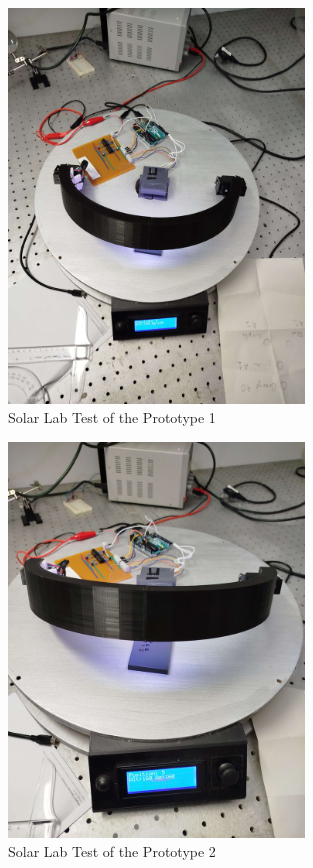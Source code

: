 \begin{figure}[htbp]
    \centering
    \includegraphics[width=0.7\textwidth]{figures/methodology/Prototype_testing/solarLab_test1.jpg}
    \caption*{Solar Lab Test of the Prototype 1} 
    \label{fig:Solar-Lab-Test-Prototype1}
    \end{figure}

\begin{figure}[htbp]
    \centering
    \includegraphics[width=0.7\textwidth]{figures/methodology/Prototype_testing/solarLab_test2.jpg}
    \caption*{Solar Lab Test of the Prototype 2} 
    \label{fig:Solar-Lab-Test-Prototype2}
\end{figure}

